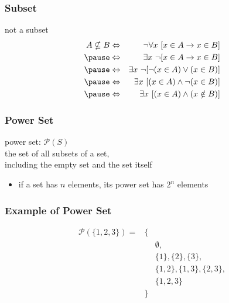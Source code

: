 \documentclass[dvipsnames]{beamer}
\begin{document}
\begin{frame}
  \frametitle{Subset}

  \begin{block}{not a subset}
    \begin{eqnarray*}
      A \nsubseteq B & \Leftrightarrow
                     & \neg \forall x~[x \in A \rightarrow x \in B]\\\pause
                     & \Leftrightarrow
                     & \exists x~\neg [x \in A \rightarrow x \in B]\\\pause
                     & \Leftrightarrow
                     & \exists x~\neg [\neg (x \in A) \vee (x \in B)]\\\pause
                     & \Leftrightarrow
                     & \exists x~[(x \in A) \wedge \neg (x \in B)]\\\pause
                     & \Leftrightarrow
                     & \exists x~[(x \in A) \wedge (x \notin B)]
    \end{eqnarray*}
  \end{block}
\end{frame}

\begin{frame}
  \frametitle{Power Set}

  \begin{definition}
    \alert{power set}: $\mathcal{P}(S)$\\
    the set of all subsets of a set,\\
    including the empty set and the set itself
  \end{definition}

  \begin{itemize}
    \item if a set has $n$ elements, its power set has $2^n$ elements
  \end{itemize}
\end{frame}

\begin{frame}
  \frametitle{Example of Power Set}

  \begin{example}
    \begin{eqnarray*}
      \mathcal{P}(\{1,2,3\}) = & \{ &\\
                               &    & \emptyset,\\
                               &    & \{1\},\{2\},\{3\},\\
                               &    & \{1,2\},\{1,3\},\{2,3\},\\
                               &    & \{1,2,3\}\\
                               & \} &
    \end{eqnarray*}
  \end{example}
\end{frame}
\end{document}
